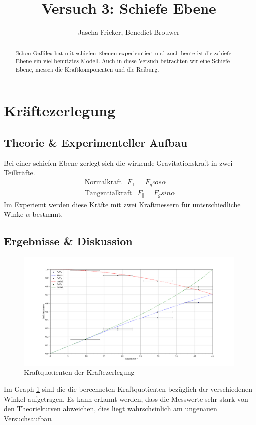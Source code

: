 \documentclass[11pt, a4paper]{article}
\title{Versuch 3: Schiefe Ebene}
\author{Jascha Fricker, Benedict Brouwer}
\begin{document}
    \maketitle

    

    \begin{abstract}
        Schon Gallileo hat mit schiefen Ebenen experiemtiert und auch heute ist die schiefe Ebene ein viel benutztes
        Modell. Auch in diese Versuch betrachten wir eine Schiefe Ebene, messen die Kraftkomponenten und
        die Reibung. 
    \end{abstract}

    \tableofcontents

    \newpage

    \section{Kräftezerlegung}
    \subsection{Theorie \& Experimenteller Aufbau}
    Bei einer schiefen Ebene zerlegt sich die wirkende Gravitationskraft in zwei Teilkräfte.
    \begin{align}
        \text{ Normalkraft } \ \ F_\perp = F_g cos \alpha \\
        \text{ Tangentialkraft } \ \ F_\parallel = F_g sin \alpha 
    \end{align}
    Im Experiemt werden diese Kräfte mit zwei Kraftmessern für unterschiedliche Winke $\alpha$ bestimmt.

    \subsection{Ergebnisse \& Diskussion}
    \begin{figure}
        \centering
        \includegraphics[width=\textwidth]{./5Kraftzer.pdf}

        \caption{Kraftquotienten der Kräftezerlegung}
        \label{fig:Kraftzer}
    \end{figure}
    Im Graph \ref{fig:Kraftzer} sind die die berechneten Kraftquotienten bezüglich der verschiedenen Winkel aufgetragen.
    Es kann erkannt werden, dass die Messwerte sehr stark von den Theoriekurven abweichen, dies liegt wahrscheinlich
    am ungenauen Versuchsaufbau.
    
\end{document}
